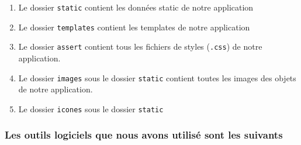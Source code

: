 \documentclass[12pt]{report}
\begin{document}
	\begin{enumerate}
		\item Le dossier {\tt static} contient les données static de notre application
		\item Le dossier {\tt templates} contient les templates de notre application	
		\item Le dossier {\tt assert} contient tous les fichiers de styles ({\tt .css}) de notre application.
		\item Le dossier {\tt images}  sous le dossier {\tt static} contient toutes les images des objets de notre application.
		\item Le dossier {\tt icones} sous le dossier {\tt static}
	\end{enumerate}
	
\subsubsection{\sc Les outils logiciels que nous avons utilisé sont les suivants}
\end{document}
